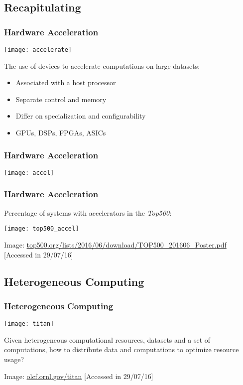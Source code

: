 \documentclass[10pt, compress]{beamer}
\begin{document}
\subsection{Recapitulating}

\begin{frame}
    \frametitle{Hardware Acceleration}
    \begin{center}
        \texttt{[image: accelerate]}
    \end{center}

    The use of \alert{devices} to accelerate computations on large datasets:

    \begin{itemize}
        \item Associated with a \alert{host} processor
        \item Separate \alert{control} and \alert{memory}
        \item Differ on \alert{specialization} and \alert{configurability}
        \item \alert{GPUs}, DSPs, FPGAs, ASICs
    \end{itemize}
\end{frame}

\begin{frame}
    \frametitle{Hardware Acceleration}
    \centering
    \texttt{[image: accel]}
\end{frame}

\begin{frame}
    \frametitle{Hardware Acceleration}
    Percentage of systems with accelerators in the \textit{Top500}:

    \begin{center}
    \texttt{[image: top500\_accel]}
    \hfill

        \tiny{Image: \url{top500.org/lists/2016/06/download/TOP500_201606_Poster.pdf} [Accessed in 29/07/16]}
    \end{center}
\end{frame}

\subsection{Heterogeneous Computing}

\begin{frame}
    \frametitle{Heterogeneous Computing}
    \begin{center}
        \texttt{[image: titan]}
    \end{center}

    Given \alert{heterogeneous} computational resources, \alert{datasets}
    and a set of \alert{computations}, how to distribute data and computations
    to \alert{optimize resource usage}?
    \hfill

    \begin{center}
    \tiny{Image: \url{olcf.ornl.gov/titan} [Accessed in 29/07/16]}
    \end{center}
\end{frame}
\end{document}
